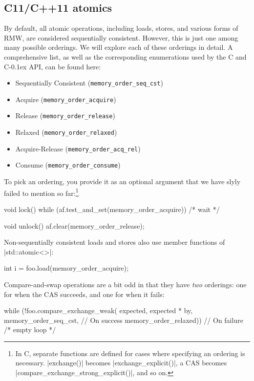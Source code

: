 \documentclass[fontsize=10pt, oneside]{scrartcl}
\newcommand{\monobox}[1]{\mbox{\texttt{#1}}}
\newcommand{\cplusplus}[1]{C\kern-0.1ex\raisebox{0.15ex}{\texttt{++}}}
\newcommand{\clang}[1]{C}
\begin{document}
\subsection{C11/C++11 atomics}

By default, all atomic operations, including loads, stores, and various forms of \textsc{RMW},
are considered sequentially consistent.
However, this is just one among many possible orderings.
We will explore each of these orderings in detail.
A comprehensive list, as well as the corresponding enumerations used by the \clang{} and \cplusplus{} \textsc{API}, can be found here:
\begin{itemize}
\item Sequentially Consistent (\monobox{memory\_order\_seq\_cst})
\item Acquire (\monobox{memory\_order\_acquire})
\item Release (\monobox{memory\_order\_release})
\item Relaxed (\monobox{memory\_order\_relaxed})
\item Acquire-Release (\monobox{memory\_order\_acq\_rel})
\item Consume (\monobox{memory\_order\_consume})
\end{itemize}
To pick an ordering,
you provide it as an optional argument that we have slyly failed to mention so far:\footnote{%
In \clang{}, separate functions are defined for cases where specifying an ordering is necessary.
\cc|exchange()| becomes \cc|exchange_explicit()|, a \textsc{CAS}
becomes \cc|compare_exchange_strong_explicit()|, and so on.}
\begin{cppcode}
void lock()
{
    while (af.test_and_set(memory_order_acquire)) { /* wait */ }
}

void unlock()
{
    af.clear(memory_order_release);
}
\end{cppcode}
Non-sequentially consistent loads and stores also use member functions of \cpp|std::atomic<>|:
\begin{cppcode}
int i = foo.load(memory_order_acquire);
\end{cppcode}
Compare-and-swap operations are a bit odd in that they have \emph{two} orderings: one for when the \textsc{CAS} succeeds, and one for when it fails:
\begin{cppcode}
while (!foo.compare_exchange_weak(
    expected, expected * by,
    memory_order_seq_cst, // On success
    memory_order_relaxed)) // On failure
    { /* empty loop */ }
\end{cppcode}
\end{document}
